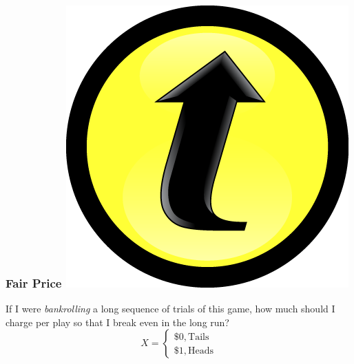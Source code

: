 \documentclass[handout]{beamer}
\begin{document}
\begin{frame}
\frametitle{Fair Price \hfill \includegraphics[scale = 0.05]{./images/clicker}}
If I were \emph{bankrolling} a long sequence of trials of this game, how much should I charge per play so that I break even in the long run?
$$X = \left\{ \begin{array}{l}  \$0, \mbox{Tails}\\ \$1, \mbox{Heads}\end{array} \right.$$
\end{frame}
\end{document}

